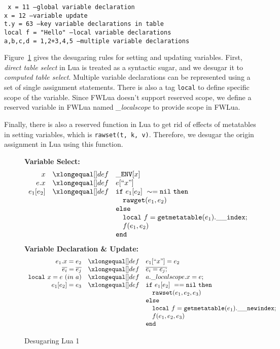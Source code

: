 \begin{flushleft}
{\tt
x = 11 ---global variable declaration\\
x = 12 ---variable update\\
t.y = 63 ---key variable declarations in table\\
local f = "Hello" ---local variable declarations\\
a,b,c,d = 1,2+3,4,5 ---multiple variable declarations\\ 
}
\end{flushleft}

Figure~\ref{fig:desLua1} gives the desugaring rules for setting and updating variables. First, {\it direct table select} in Lua is treated as a syntactic sugar, and we desugar it to {\it computed table select}. Multiple variable declarations can be represented using a set of single assignment statements. There is also a tag {\tt local} to define specific scope of the variable. Since FWLua doesn't support reserved scope, we define a reserved variable in FWLua named {\it \_localscope} to provide scope in FWLua.

Finally, there is also a reserved function in Lua to get rid of effects of metatables in setting variables, which is {\tt rawset(t, k, v)}. Therefore, we desugar the origin assignment in Lua using this function.

\begin{figure}
\caption{Desugaring Lua 1}\label{fig:desLua1}
{\bf Variable Select:}\[
\begin{array}{rclcl}
\desugar{x}{{\tt \_ENV}[x]}
\desugar{e.x}{e[``x"]}
\desugar{e_1[e_2]}{{\tt if}~ e_1[e_2] ~\sim= {\tt nil} ~ {\tt then}\\}
\desugarline{ 
     \quad{\tt rawget}(e_1, e_2) ~\\
     {\tt else}\\
     \quad{\tt local}~f = {\tt getmetatable}(e_1).{\tt{\_}{\_}index};\\
     \quad f(e_1,e_2)\\ 
     {\tt end}
}
\end{array}\]
{\bf Variable Declaration \& Update:}\[
\begin{array}{rclcl}
\desugar{e_1.x=e_2}{e_1[``x"] = e_2}
\desugar{\overline{e_i}=\overline{e_j}}{\overline{e_i = e_j;}}
\desugar{{\tt local}~x=e~(in~a)}{a.\_localscope.x = e;}
\desugar{e_1[e_2]=e_3}{
    {\tt if}~ e_1[e_2] ~== {\tt nil} ~ {\tt then}\\
}
\desugarline{  
     \quad{\tt rawset}(e_1, e_2,e_3) ~\\
     {\tt else}\\
     \quad{\tt local}~f = {\tt getmetatable}(e_1).{\tt{\_}{\_}newindex};\\
     \quad f(e_1,e_2,e_3)\\ 
     {\tt end}\\
}
\end{array}\]
\end{figure}



